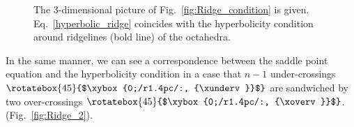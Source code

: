 \documentclass[12pt]{article}
\numberwithin{equation}{section}
\begin{document}
\begin{figure}[htbp]
  \begin{center}
    \parbox{5cm}{
      \begin{psfrags}
      \end{psfrags}
      }
%
    \parbox{5cm}{
      \begin{psfrags}
      \end{psfrags}
      }
%
    \parbox{4cm}{
      \begin{psfrags}
      \end{psfrags}
      }
%
    \caption{
      The 3-dimensional picture of
      Fig.~\ref{fig:Ridge_condition} is given.
      Eq.~\eqref{hyperbolic_ridge} coincides with the hyperbolicity
      condition around  ridgelines (bold line)
      of the octahedra.
      }
    \label{fig:Ridge_octa}
  \end{center}
\end{figure}

In the same manner, we can see a correspondence between the    saddle
point equation and the hyperbolicity condition in a case
that
$n-1$ under-crossings $\text{\rotatebox{45}{$\xybox{0;/r1.4pc/:, {\xunderv}}$}}$
are  sandwiched by two over-crossings
$\text{\rotatebox{45}{$\xybox{0;/r1.4pc/:, {\xoverv}}$}}$.
(Fig.~\ref{fig:Ridge_2}).
\end{document}
